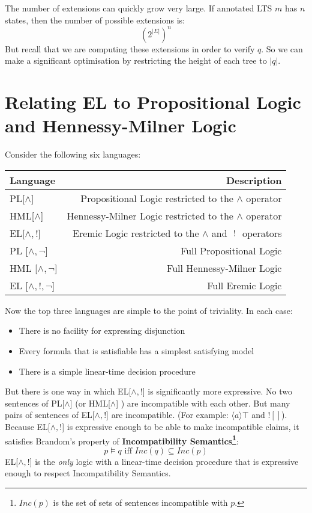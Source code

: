 The number of extensions can quickly grow very large.
If annotated LTS $m$ has $n$ states, then the number of possible extensions is:
\[
({2^{|\Sigma|}})^n
\] 
But recall that we are computing these extensions in order to verify $q$. So we can make a significant optimisation by restricting the height of each tree to $|q|$.

\section{Relating EL to Propositional Logic and Hennessy-Milner Logic}
Consider the following six languages:
\begin{center}
\begin{tabular}{ l | r }
Language & Description \\
\hline
PL[$\land$] & Propositional Logic restricted to the $\land$ operator \\
HML[$\land$] & Hennessy-Milner Logic restricted to the $\land$ operator \\
EL[$\land, !$] & Eremic Logic restricted to the $\land$ and $\ ! \ $ operators \\
PL [$\land, \neg$] & Full Propositional Logic \\
HML [$\land, \neg$] & Full Hennessy-Milner Logic \\
EL [$\land, !, \neg$] & Full Eremic Logic \\
\end{tabular}
\end{center}
Now the top three languages are simple to the point of triviality. In each case:
\begin{itemize}
\item
There is no facility for expressing disjunction
\item
Every formula that is satisfiable has a simplest satisfying model
\item
There is a simple linear-time decision procedure
\end{itemize}
But there is one way in which EL[$\land, !$]  is significantly more expressive.
No two sentences of PL[$\land$] (or HML[$\land$] ) are incompatible with each other. 
But many pairs of sentences of EL[$\land, !$] are incompatible.
(For example: $\langle a \rangle \top$ and $! []$). 
Because EL[$\land, !$]  is expressive enough to be able to make incompatible claims, it satisfies Brandom's property of {\bf Incompatibility Semantics\footnote{$Inc(p)$ is the set of sets of sentences incompatible with $p$.}}:
\[
p \models q \mbox{ iff } Inc(q) \subseteq Inc(p)
\]
EL[$\land, !$]  is the \emph{only} logic with a linear-time decision procedure that is expressive enough to respect Incompatibility Semantics.

